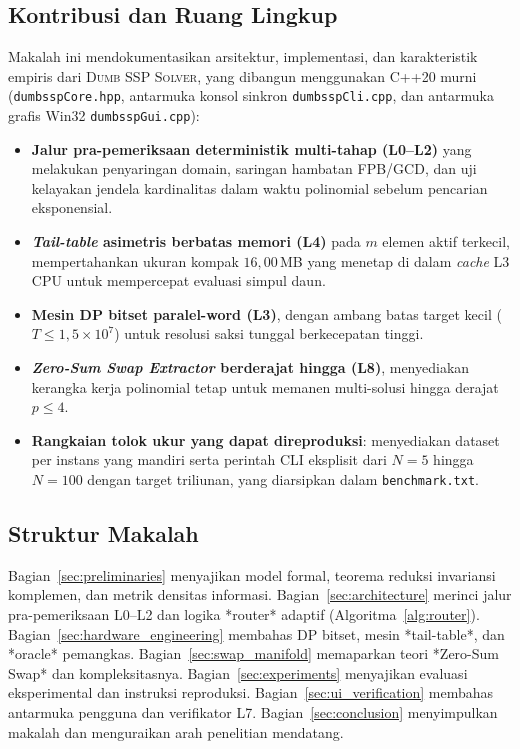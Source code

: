 \documentclass[journal,onecolumn,11pt]{IEEEtran}
\begin{document}
\subsection{Kontribusi dan Ruang Lingkup}
Makalah ini mendokumentasikan arsitektur, implementasi, dan karakteristik empiris dari \textsc{Dumb SSP Solver}, yang dibangun menggunakan C++20 murni (\texttt{dumbsspCore.hpp}, antarmuka konsol sinkron \texttt{dumbsspCli.cpp}, dan antarmuka grafis Win32 \texttt{dumbsspGui.cpp}):
\begin{itemize}
    \item \textbf{Jalur pra-pemeriksaan deterministik multi-tahap (L0--L2)} yang melakukan penyaringan domain, saringan hambatan FPB/GCD, dan uji kelayakan jendela kardinalitas dalam waktu polinomial sebelum pencarian eksponensial.
    \item \textbf{\textit{Tail-table} asimetris berbatas memori (L4)} pada $m$ elemen aktif terkecil, mempertahankan ukuran kompak $16{,}00$\,MB yang menetap di dalam \textit{cache} L3 CPU untuk mempercepat evaluasi simpul daun.
    \item \textbf{Mesin DP bitset paralel-word (L3)}, dengan ambang batas target kecil ($T \le 1{,}5\times10^7$) untuk resolusi saksi tunggal berkecepatan tinggi.
    \item \textbf{\textit{Zero-Sum Swap Extractor} berderajat hingga (L8)}, menyediakan kerangka kerja polinomial tetap untuk memanen multi-solusi hingga derajat $p \le 4$.
    \item \textbf{Rangkaian tolok ukur yang dapat direproduksi}: menyediakan dataset per instans yang mandiri serta perintah CLI eksplisit dari $N=5$ hingga $N=100$ dengan target triliunan, yang diarsipkan dalam \texttt{benchmark.txt}.
\end{itemize}

\subsection{Struktur Makalah}
Bagian~\ref{sec:preliminaries} menyajikan model formal, teorema reduksi invariansi komplemen, dan metrik densitas informasi. Bagian~\ref{sec:architecture} merinci jalur pra-pemeriksaan L0--L2 dan logika *router* adaptif (Algoritma~\ref{alg:router}). Bagian~\ref{sec:hardware_engineering} membahas DP bitset, mesin *tail-table*, dan *oracle* pemangkas. Bagian~\ref{sec:swap_manifold} memaparkan teori *Zero-Sum Swap* dan kompleksitasnya. Bagian~\ref{sec:experiments} menyajikan evaluasi eksperimental dan instruksi reproduksi. Bagian~\ref{sec:ui_verification} membahas antarmuka pengguna dan verifikator L7. Bagian~\ref{sec:conclusion} menyimpulkan makalah dan menguraikan arah penelitian mendatang.
\end{document}
